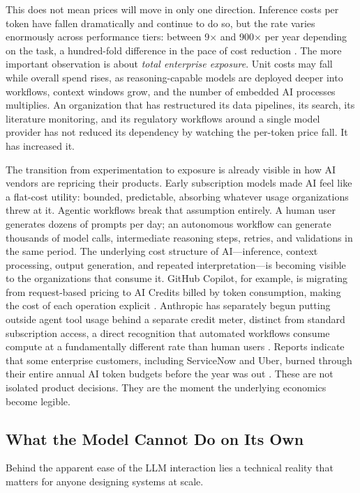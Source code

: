 \documentclass[man,12pt,donotrepeattitle]{apa7}
\begin{document}
This does not mean prices will move in only one direction. Inference costs
per token have fallen dramatically and continue to do so, but the rate
varies enormously across performance tiers: between 9$\times$ and
900$\times$ per year depending on the task, a hundred-fold difference in
the pace of cost reduction \parencite{epochai2025}. The more important
observation is about \textit{total enterprise exposure}. Unit costs may
fall while overall spend rises, as reasoning-capable models are deployed
deeper into workflows, context windows grow, and the number of embedded AI
processes multiplies. An organization that has restructured its data
pipelines, its search, its literature monitoring, and its regulatory
workflows around a single model provider has not reduced its dependency by
watching the per-token price fall. It has increased it.

The transition from experimentation to exposure is already visible in how
AI vendors are repricing their products. Early subscription models made AI
feel like a flat-cost utility: bounded, predictable, absorbing whatever
usage organizations threw at it. Agentic workflows break that assumption
entirely. A human user generates dozens of prompts per day; an autonomous
workflow can generate thousands of model calls, intermediate reasoning
steps, retries, and validations in the same period. The underlying cost
structure of AI---inference, context processing, output generation, and
repeated interpretation---is becoming visible to the organizations that
consume it. GitHub Copilot, for example, is migrating from request-based
pricing to AI Credits billed by token consumption, making the cost of each
operation explicit \parencite{rodriguez2026}. Anthropic has separately
begun putting outside agent tool usage behind a separate credit meter,
distinct from standard subscription access, a direct recognition that
automated workflows consume compute at a fundamentally different rate than
human users \parencite{fried2026}. Reports indicate that some enterprise
customers, including ServiceNow and Uber, burned through their entire
annual AI token budgets before the year was out \parencite{fried2026}.
These are not isolated product decisions. They are the moment the
underlying economics become legible.

\subsection{What the Model Cannot Do on Its Own}

Behind the apparent ease of the LLM interaction lies a technical reality
that matters for anyone designing systems at scale.
\end{document}
